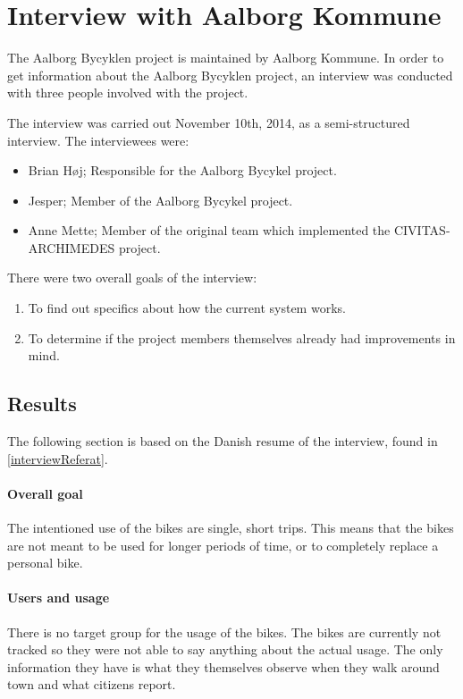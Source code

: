 \section{Interview with Aalborg Kommune}
The Aalborg Bycyklen project is maintained by Aalborg Kommune.
In order to get information about the Aalborg Bycyklen project, an interview was conducted with three people involved with the project.

The interview was carried out November 10th, 2014, as a semi-structured interview.
The interviewees were:
\begin{itemize}
\item Brian Høj; Responsible for the Aalborg Bycykel project.
\item Jesper; Member of the Aalborg Bycykel project.
\item Anne Mette; Member of the original team which implemented the CIVITAS-ARCHIMEDES project.
\end{itemize}

There were two overall goals of the interview:
\begin{enumerate}
\item To find out specifics about how the current system works.
\item To determine if the project members themselves already had improvements in mind.
\end{enumerate}

\subsection{Results} \label{interview:goals}
The following section is based on the Danish resume of the interview, found in \cref{interviewReferat}.

\paragraph{Overall goal}
The intentioned use of the bikes are single, short trips.
This means that the bikes are not meant to be used for longer periods of time, or to completely replace a personal bike.

\paragraph{Users and usage}
There is no target group for the usage of the bikes.
The bikes are currently not tracked so they were not able to say anything about the actual usage.
The only information they have is what they themselves observe when they walk around town and what citizens report.

